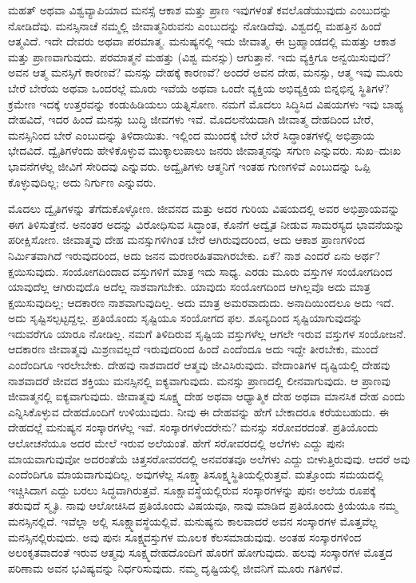 ಮಹತ್​ ಅಥವಾ ವಿಶ್ವವ್ಯಾಪಿಯಾದ ಮನಸ್ಸೆ ಆಕಾಶ ಮತ್ತು ಪ್ರಾಣ ಇವುಗಳಂತೆ ಕವಲೊಡೆಯುವುದು ಎಂಬುದನ್ನು ನೋಡಿದೆವು. ಮನಸ್ಸಿನಾಚೆ ನಮ್ಮಲ್ಲಿ ಜೀವಾತ್ಮನಿರುವನು ಎಂಬುದನ್ನು ನೋಡಿದೆವು. ವಿಶ್ವದಲ್ಲಿ ಮಹತ್ತಿನ ಹಿಂದೆ ಆತ್ಮವಿದೆ. ಇದೇ ದೇವರು ಅಥವಾ ಪರಮಾತ್ಮ. ಮನುಷ್ಯನಲ್ಲಿ ಇದು ಜೀವಾತ್ಮ. ಈ ಬ್ರಹ್ಮಾಂಡದಲ್ಲಿ ಮಹತ್ತು ಆಕಾಶ ಮತ್ತು ಪ್ರಾಣವಾಗುವುದು. ಪರಮಾತ್ಮನೆ ಮಹತ್ತು (ವಿಶ್ವ ಮನಸ್ಸು) ಆಗುತ್ತಾನೆ. ಇದು ವ್ಯಕ್ತಿಗೂ ಅನ್ವಯಿಸುವುದೆ? ಅವನ ಆತ್ಮ ಮನಸ್ಸಿಗೆ ಕಾರಣವೆ? ಮನಸ್ಸು ದೇಹಕ್ಕೆ ಕಾರಣವೆ? ಅಂದರೆ ಅವನ ದೇಹ, ಮನಸ್ಸು, ಆತ್ಮ ಇವು ಮೂರು ಬೇರೆ ಬೇರೆಯ ಅಥವಾ ಒಂದರಲ್ಲೆ ಮೂರು ಇವೆಯೆ ಅಥವಾ ಒಂದೇ ವ್ಯಕ್ತಿಯ ಅಭಿವ್ಯಕ್ತಿಯ ಬಿನ್ನಭಿನ್ನ ಸ್ಥಿತಿಗಳೆ? ಕ್ರಮೇಣ ಇದಕ್ಕೆ ಉತ್ತರವನ್ನು ಕಂಡುಹಿಡಿಯಲು ಯತ್ನಿಸೋಣ. ನಮಗೆ ಮೊದಲು ಸಿದ್ಧಿಸಿದ ವಿಷಯಗಳು ಇವು ಬಾಹ್ಯ ದೇಹವಿದೆ, ಇದರ ಹಿಂದೆ ಮನಸ್ಸು ಬುದ್ಧಿ ಜೀವಗಳು ಇವೆ. ಮೊದಲನೆಯದಾಗಿ ಜೀವಾತ್ಮ ದೇಹದಿಂದ ಬೇರೆ, ಮನಸ್ಸಿನಿಂದ ಬೇರೆ ಎಂಬುದನ್ನು ತಿಳಿದಾಯಿತು. ಇಲ್ಲಿಂದ ಮುಂದಕ್ಕೆ ಬೇರೆ ಬೇರೆ ಸಿದ್ಧಾಂತಗಳಲ್ಲಿ ಅಭಿಪ್ರಾಯ ಭೇದವಿದೆ. ದ್ವೈತಿಗಳೆಂದು ಹೇಳಿಕೊಳ್ಳುವ ಮುಕ್ಕಾಲುಪಾಲು ಜನರು ಜೀವಾತ್ಮನನ್ನು ಸಗುಣ ಎನ್ನುವರು. ಸುಖ–ದುಃಖ ಭಾವನೆಗಳೆಲ್ಲ ಜೀವಿಗೆ ಸೇರಿದವು ಎನ್ನುವರು. ಅದ್ವೈತಿಗಳು ಆತ್ಮನಿಗೆ ಇಂತಹ ಗುಣಗಳಿವೆ ಎಂಬುದನ್ನು ಒಪ್ಪಿ ಕೊಳ್ಳುವುದಿಲ್ಲ; ಅದು ನಿರ್ಗುಣ ಎನ್ನುವರು.

ಮೊದಲು ದ್ವೈತಿಗಳನ್ನು ತೆಗೆದುಕೊಳ್ಳೋಣ. ಜೀವನದ ಮತ್ತು ಅದರ ಗುರಿಯ ವಿಷಯದಲ್ಲಿ ಅವರ ಅಭಿಪ್ರಾಯವನ್ನು ಈಗ ತಿಳಿಸುತ್ತೇನೆ. ಅನಂತರ ಅದನ್ನು ವಿರೋಧಿಸುವ ಸಿದ್ಧಾಂತ, ಕೊನೆಗೆ ಅದ್ವೈತ ನೀಡುವ ಸಾಮರಸ್ಯದ ಭಾವನೆಯನ್ನು ಪರೀಕ್ಷಿಸೋಣ. ಜೀವಾತ್ಮವು ದೇಹ ಮನಸ್ಸುಗಳಿಗಿಂತ ಬೇರೆ ಆಗಿರುವುದರಿಂದ, ಅದು ಆಕಾಶ ಪ್ರಾಣಗಳಿಂದ ನಿರ್ಮಿತವಾಗಿದೆ ಇರುವುದರಿಂದ, ಅದು ಜನನ ಮರಣರಹಿತವಾಗಿರಬೇಕು. ಏಕೆ? ನಾಶ ಎಂದರೆ ಏನು ಅರ್ಥ? ಕ್ಷಯಿಸುವುದು. ಸಂಯೋಗದಿಂದಾದ ವಸ್ತುಗಳಿಗೆ ಮಾತ್ರ ಇದು ಸಾಧ್ಯ. ಎರಡು ಮೂರು ವಸ್ತುಗಳ ಸಂಯೋಗದಿಂದ ಯಾವುದೆಲ್ಲ ಆಗಿರುವುದೊ ಅದೆಲ್ಲ ನಾಶವಾಗಬೇಕು. ಯಾವುದು ಸಂಯೋಗದಿಂದ ಆಗಿಲ್ಲವೊ ಅದು ಮಾತ್ರ ಕ್ಷಯಿಸುವುದಿಲ್ಲ; ಆದಕಾರಣ ನಾಶವಾಗುವುದಿಲ್ಲ. ಅದು ಮಾತ್ರ ಅಮರವಾದುದು. ಅನಾದಿಯಿಂದಲೂ ಅದು ಇದೆ. ಅದು ಸೃಷ್ಟಿಸಲ್ಪಟ್ಟದ್ದಲ್ಲ. ಪ್ರತಿಯೊಂದು ಸೃಷ್ಟಿಯೂ ಸಂಯೋಗದ ಫಲ. ಶೂನ್ಯದಿಂದ ಸೃಷ್ಟಿಯಾಗುವುದನ್ನು ಇದುವರೆಗೂ ಯಾರೂ ನೋಡಿಲ್ಲ. ನಮಗೆ ತಿಳಿದಿರುವ ಸೃಷ್ಟಿಯ ವಸ್ತುಗಳೆಲ್ಲ ಆಗಲೇ ಇರುವ ವಸ್ತುಗಳ ಸಂಯೋಜನೆ. ಆದಕಾರಣ ಜೀವಾತ್ಮವು ಮಿಶ್ರಣವಲ್ಲದೆ ಇರುವುದರಿಂದ ಹಿಂದೆ ಎಂದೆಂದೂ ಅದು ಇದ್ದೇ ತೀರಬೇಕು, ಮುಂದೆ ಎಂದೆಂದಿಗೂ ಇರಲೇಬೇಕು. ದೇಹವು ನಾಶವಾದರೆ ಆತ್ಮವು ಜೀವಿಸಿರುವುದು. ವೇದಾಂತಿಗಳ ದೃಷ್ಟಿಯಲ್ಲಿ ದೇಹವು ನಾಶವಾದರೆ ಜೀವದ ಶಕ್ತಿಯು ಮನಸ್ಸಿನಲ್ಲಿ ಐಕ್ಯವಾಗುವುದು. ಮನಸ್ಸು ಪ್ರಾಣದಲ್ಲಿ ಲೀನವಾಗುವುದು. ಆ ಪ್ರಾಣವು ಜೀವಾತ್ಮನಲ್ಲಿ ಐಕ್ಯವಾಗುವುದು. ಜೀವಾತ್ಮವು ಸೂಕ್ಷ್ಮ ದೇಹ ಅಥವಾ ಆಧ್ಯಾತ್ಮಿಕ ದೇಹ ಅಥವಾ ಮಾನಸಿಕ ದೇಹ ಎಂದು ಎನ್ನಿಸಿಕೊಳ್ಳುವ ದೇಹದೊಂದಿಗೆ ಉಳಿಯುವುದು. ನೀವು ಈ ದೇಹವನ್ನು ಹೇಗೆ ಬೇಕಾದರೂ ಕರೆಯಬಹುದು. ಈ ದೇಹದಲ್ಲೆ ಮನುಷ್ಯನ ಸಂಸ್ಕಾರಗಳೆಲ್ಲ ಇವೆ. ಸಂಸ್ಕಾರಗಳೆಂದರೇನು? ಮನಸ್ಸು ಸರೋವರದಂತೆ. ಪ್ರತಿಯೊಂದು ಆಲೋಚನೆಯೂ ಅದರ ಮೇಲೆ ಇರುವ ಅಲೆಯಂತೆ. ಹೇಗೆ ಸರೋವರದಲ್ಲಿ ಅಲೆಗಳು ಎದ್ದು ಪುನಃ ಮಾಯವಾಗುವುವೋ ಅದರಂತೆಯೆ ಚಿತ್ತಸರೋವರದಲ್ಲಿ ಅನವರತವೂ ಅಲೆಗಳು ಎದ್ದು ಬೀಳುತ್ತಿರುವುವು. ಆದರೆ ಅವು ಎಂದೆಂದಿಗೂ ಮಾಯವಾಗುವುದಿಲ್ಲ. ಅವುಗಳೆಲ್ಲ ಸೂಕ್ಷ್ಮಾತಿಸೂಕ್ಷ್ಮಸ್ಥಿತಿಯಲ್ಲಿರುತ್ತವೆ. ಮತ್ತೊಂದು ಸಮಯದಲ್ಲಿ ಇಚ್ಚಿಸಿದಾಗ ಎದ್ದು ಬರಲು ಸಿದ್ಧವಾಗಿರುತ್ತವೆ. ಸೂಕ್ಷಾವಸ್ಥೆಯಲ್ಲಿರುವ ಸಂಸ್ಕಾರಗಳನ್ನು ಪುನಃ ಅಲೆಯ ರೂಪಕ್ಕೆ ತರುವುದೆ ಸ್ಮೃತಿ. ನಾವು ಆಲೋಚಿಸಿದ ಪ್ರತಿಯೊಂದು ವಿಷಯವೂ, ನಾವು ಮಾಡಿದ ಪ್ರತಿಯೊಂದು ಕ್ರಿಯೆಯೂ ನಮ್ಮ ಮನಸ್ಸಿನಲ್ಲಿದೆ. ಇವೆಲ್ಲಾ ಅಲ್ಲಿ ಸೂಕ್ಷ್ಮಾವಸ್ಥೆಯಲ್ಲಿವೆ. ಮನುಷ್ಯನು ಕಾಲವಾದರೆ ಅವನ ಸಂಸ್ಕಾರಗಳ ಮೊತ್ತವೆಲ್ಲ ಮನಸ್ಸಿನಲ್ಲಿರುವುದು. ಅವು ಪುನಃ ಸೂಕ್ಷ್ಮವಸ್ತುಗಳ ಮೂಲಕ ಕೆಲಸಮಾಡುವುವು. ಅಂತಹ ಸಂಸ್ಕಾರಗಳಿಂದ ಅಲಂಕೃತವಾದಂತೆ ಇರುವ ಆತ್ಮವು ಸೂಕ್ಷ್ಮದೇಹದೊಂದಿಗೆ ಹೊರಗೆ ಹೋಗುವುದು. ಹಲವು ಸಂಸ್ಕಾರಗಳ ಮೊತ್ತದ ಪರಿಣಾಮ ಅವನ ಭವಿಷ್ಯವನ್ನು ನಿರ್ಧರಿಸುವುದು. ನಮ್ಮ ದೃಷ್ಟಿಯಲ್ಲಿ ಜೀವನಿಗೆ ಮೂರು ಗತಿಗಳಿವೆ.

